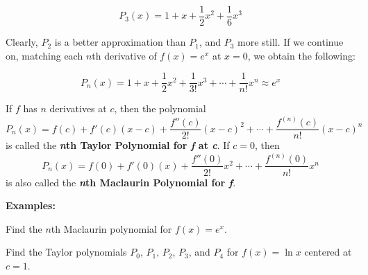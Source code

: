 \documentclass[addpoints, 12pt]{exam}
\begin{document}
\begin{minipage}{0.45\linewidth}
    \[P_3(x)=1+x+\frac{1}{2}x^2+\frac{1}{6}x^3\]
\end{minipage}
\hfill
\begin{minipage}{0.45\linewidth}
\end{minipage}

Clearly, $P_2$ is a better approximation than $P_1$, and $P_3$ more still. If we continue on, matching each $n$th derivative of $f(x)=e^x$ at $x=0$, we obtain the following:

\[P_n(x)=1+x+\frac{1}{2}x^2+\frac{1}{3!}x^3+\cdots+\frac{1}{n!}x^n\approx e^x\]

\vspace{.1in}

\begin{tcolorbox}[title= DEFINITIONS OF THE \textit{\textbf{n}}TH TAYLOR POLYNOMIAL AND \textbf{\textit{n}}TH MACLAURIN POLYNOMIAL,black,sharp corners,colback=white,colbacktitle=white,coltitle=black]

    If $f$ has $n$ derivatives at $c$, then the polynomial
    \[P_n(x)=f(c)+f'(c)(x-c)+\frac{f''(c)}{2!}(x-c)^2+\cdots+\frac{f^{(n)}(c)}{n!}(x-c)^n\]
    is called the \textbf{\textit{n}th Taylor Polynomial for \textit{f} at \textit{c}}. If $c=0$, then
    \[P_n(x)=f(0)+f'(0)(x)+\frac{f''(0)}{2!}x^2+\cdots+\frac{f^{(n)}(0)}{n!}x^n\]
    is also called the \textbf{\textit{n}th Maclaurin Polynomial for \textit{f}}. 

\end{tcolorbox}

\newpage

\noindent\textbf{Examples:}
\begin{questions}
    \question Find the $n$th Maclaurin polynomial for $f(x)=e^x$.
    
    \question Find the Taylor polynomials $P_0,\,P_1,\,P_2,\,P_3,\,$and $P_4$ for $f(x)=\ln x$ centered at $c=1$.
\end{questions}
\end{document}
